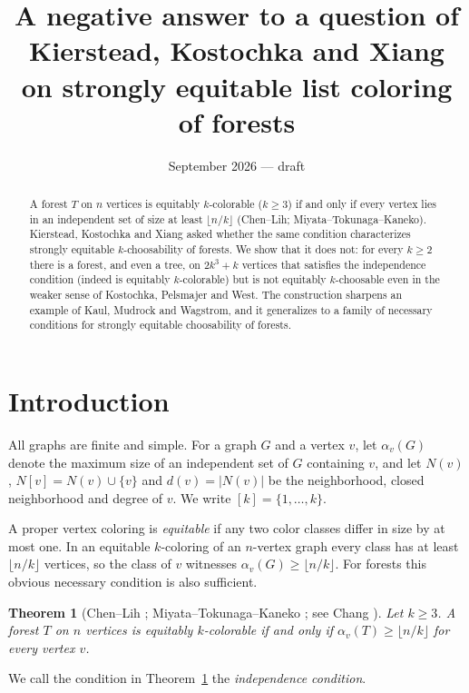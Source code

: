 \documentclass[11pt]{article}
\title{A negative answer to a question of Kierstead, Kostochka and Xiang\\
on strongly equitable list coloring of forests}
\author{}
\date{September 2026 --- draft}
\newtheorem{theorem}{Theorem}
\theoremstyle{definition}
\begin{document}
\maketitle

\begin{abstract}
A forest $T$ on $n$ vertices is equitably $k$-colorable ($k\ge 3$) if and only if every
vertex lies in an independent set of size at least $\lfloor n/k\rfloor$ (Chen--Lih;
Miyata--Tokunaga--Kaneko). Kierstead, Kostochka and Xiang asked whether the same
condition characterizes strongly equitable $k$-choosability of forests. We show that it
does not: for every $k\ge 2$ there is a forest, and even a tree, on $2k^3+k$ vertices
that satisfies the independence condition (indeed is equitably $k$-colorable) but is not
equitably $k$-choosable even in the weaker sense of Kostochka, Pelsmajer and West.
The construction sharpens an example of Kaul, Mudrock and Wagstrom, and it generalizes
to a family of necessary conditions for strongly equitable choosability of forests.
\end{abstract}

\section{Introduction}

All graphs are finite and simple. For a graph $G$ and a vertex $v$, let $\alpha_v(G)$
denote the maximum size of an independent set of $G$ containing $v$, and let $N(v)$,
$N[v]=N(v)\cup\{v\}$ and $d(v)=|N(v)|$ be the neighborhood, closed neighborhood and
degree of $v$. We write $[k]=\{1,\dots,k\}$.

A proper vertex coloring is \emph{equitable} if any two color classes differ in size by
at most one. In an equitable $k$-coloring of an $n$-vertex graph every class has at least
$\lfloor n/k\rfloor$ vertices, so the class of $v$ witnesses
$\alpha_v(G)\ge\lfloor n/k\rfloor$. For forests this obvious necessary condition is also
sufficient.

\begin{theorem}[Chen--Lih \cite{CL}; Miyata--Tokunaga--Kaneko \cite{MTK}; see Chang \cite{Chang}]
\label{thm:CL}
Let $k\ge 3$. A forest $T$ on $n$ vertices is equitably $k$-colorable if and only if
$\alpha_v(T)\ge\lfloor n/k\rfloor$ for every vertex $v$.
\end{theorem}

We call the condition in Theorem~\ref{thm:CL} the \emph{independence condition}.
\end{document}
